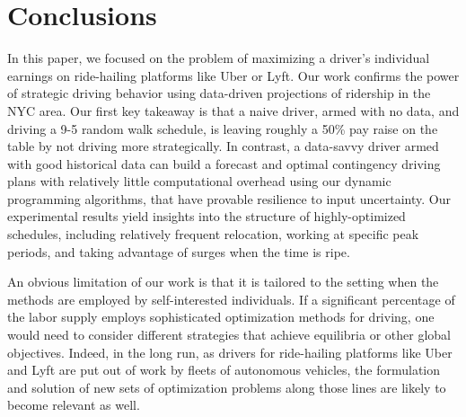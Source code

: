 
\section{Conclusions}
\label{sec:conclusions}
In this paper, we focused on the problem of 
maximizing a driver's individual earnings on ride-hailing platforms like Uber or Lyft.
Our work confirms the power of strategic driving behavior %
using data-driven projections
of ridership in the NYC area.  Our first key takeaway is that a naive driver,
armed with no data, and driving a 9-5 random walk schedule, is leaving 
roughly a 50\% pay raise on the table by not driving more strategically. 
In contrast, a data-savvy driver armed with
good historical data can build a forecast and optimal contingency driving plans 
with relatively little computational overhead using 
our dynamic programming algorithms, that have provable resilience to input
uncertainty.  Our experimental results yield insights into the
structure of highly-optimized schedules, including relatively frequent relocation,
working at specific peak periods, and taking advantage of 
surges when the time is ripe.  

An obvious limitation of our work is that it is tailored to the setting when the 
methods are employed by self-interested individuals.  If a 
significant percentage of the labor supply employs sophisticated optimization methods
for driving, one would need to consider different strategies that achieve equilibria
or other global objectives. %
Indeed, in the long run, as drivers for ride-hailing 
platforms like Uber and Lyft are put out of work by fleets of autonomous vehicles, 
the formulation and solution of new sets of optimization problems along those lines
are likely to become relevant as well.




